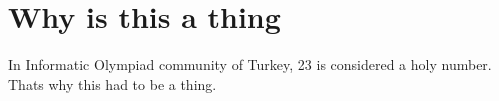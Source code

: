\chapter{Why is this a thing}
\hypertarget{md_README}{}\label{md_README}
\label{md_README_autotoc_md0}%
%
In Informatic Olympiad community of Turkey, 23 is considered a holy number. That\textquotesingle{}s why this had to be a thing. 